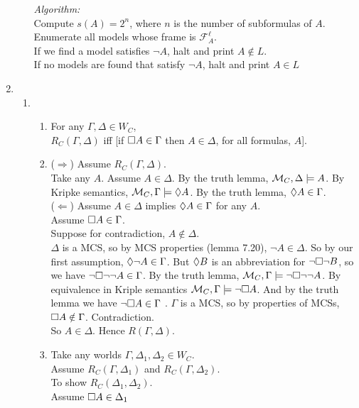 \documentclass[a4paper, draft, 12pt]{article}
\begin{document}
\begin{enumerate}
\begin{enumerate}
  \textit{Algorithm:}\\
  Compute $s(A) = 2^{n}$, where $n$ is the number of subformulas of $A$. \\
  Enumerate all models whose frame is $\mathcal{F}^{\ell}_{A}$. \\
  If we find a model satisfies $\neg A$, halt and print $A \notin L$.\\
  If no models are found that satisfy $\neg A$, halt and print $A \in L$
  \end{enumerate}
\item %
  \begin{enumerate}
  \item
  \begin{enumerate}
  \item  
  For any $\Gamma, \Delta \in W_C$, \\
  $R_C(\Gamma, \Delta)$ iff [if $\square A \in \Gamma$ then $A \in \Delta$, for all formulas, $A$].  
  \item 
  ($\Rightarrow$) Assume $R_C(\Gamma, \Delta)$. \\
  Take any $A$. Assume $A \in \Delta$.
  By the truth lemma, $\mathcal{M}_C, \Delta \models A$.
  By Kripke semantics, $\mathcal{M}_C, \Gamma \models \Diamond A$.
  By the truth lemma, $\Diamond A \in \Gamma$. \\
  ($\Leftarrow$) Assume $A \in \Delta$ implies $\Diamond A \in \Gamma$ for any $A$. \\
  Assume $\square A \in \Gamma$. \\
  Suppose for contradiction, $A \notin \Delta$. \\
  $\Delta$ is a MCS, so by MCS properties (lemma 7.20), $\neg A \in \Delta$. 
  So by our first assumption, $\Diamond \neg A \in \Gamma$.
  But $\Diamond B$ is an abbreviation for $\neg \square \neg B$, 
  so we have $\neg \square \neg \neg A \in \Gamma$. 
  By the truth lemma, $\mathcal{M}_C, \Gamma \models \neg \square \neg \neg A$. 
  By equivalence in Kriple semantics $\mathcal{M}_C, \Gamma \models \neg \square A$. 
  And by the truth lemma we have $\neg \square A \in \Gamma$ .
  $\Gamma$ is a MCS, so by properties of MCSs, $\square A \notin \Gamma$. Contradiction. \\
  So $A \in \Delta$. Hence $R(\Gamma,\Delta)$.
  \item
  Take any worlds $\Gamma, \Delta_1, \Delta_2 \in W_C$. \\
  Assume $R_C(\Gamma, \Delta_1)$ and $R_C(\Gamma, \Delta_2)$.\\
  To show $R_C(\Delta_1, \Delta_2)$. \\
  Assume $\square A \in \Delta_1$ \\

\end{enumerate}
\end{enumerate}
\end{enumerate}
\end{document}
